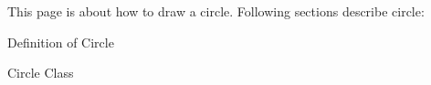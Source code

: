 This page is about how to draw a circle. Following sections describe circle\+:
\begin{DoxyItemize}
\item Definition of Circle
\item Circle Class  
\end{DoxyItemize}